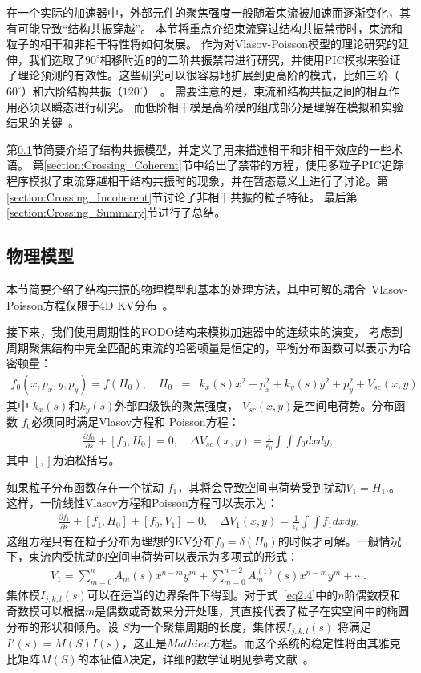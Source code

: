 在一个实际的加速器中，外部元件的聚焦强度一般随着束流被加速而逐渐变化，其有可能导致“结构共振穿越”。
本节将重点介绍束流穿过结构共振禁带时，束流和粒子的相干和非相干特性将如何发展。
作为对Vlasov-Poisson模型的理论研究的延伸，我们选取了$90^{\circ}$相移附近的的二阶共振禁带进行研究，并使用PIC模拟来验证了理论预测的有效性。这些研究可以很容易地扩展到更高阶的模式，比如三阶（$60^{\circ}$）和六阶结构共振（$120^{\circ}$）~\cite{36,40}。
需要注意的是，束流和结构共振之间的相互作用必须以瞬态进行研究。
而低阶相干模是高阶模的组成部分是理解在模拟和实验结果的关键~\cite{groening2009experimental,33}。

第\ref{section:Crossing_model}节简要介绍了结构共振模型，并定义了用来描述相干和非相干效应的一些术语。
第\ref{section:Crossing_Coherent}节中给出了禁带的方程，使用多粒子PIC追踪程序模拟了束流穿越相干结构共振时的现象，并在暂态意义上进行了讨论。第\ref{section:Crossing_Incoherent}节讨论了非相干共振的粒子特征。
最后第\ref{section:Crossing_Summary}节进行了总结。

\subsection{物理模型}
\label{section:Crossing_model}
本节简要介绍了结构共振的物理模型和基本的处理方法，其中可解的耦合~Vlasov-Poisson方程仅限于4D KV分布~\cite{20}。

接下来，我们使用周期性的FODO结构来模拟加速器中的连续束的演变， 考虑到周期聚焦结构中完全匹配的束流的哈密顿量是恒定的，平衡分布函数可以表示为哈密顿量：
\begin{eqnarray}\label{eq2.1}
  f_0(x,p_x,y,p_y) =f(H_0),  \quad  H_0&=&k_x(s)x^2+p_x^2+k_y(s)y^2+p_y^2+V_{sc}(x,y)
\end{eqnarray}
其中 $k_x(s)$和$k_y(s)$外部四级铁的聚焦强度， $V_{sc}(x,y)$是空间电荷势。分布函数 $f_0$必须同时满足Vlasov方程和 Poisson方程：
\begin{eqnarray}\label{eq2.2}
\frac{\partial f_0}{\partial s} + [f_0,H_0]=0,   \quad \Delta V_{sc}(x,y)  = \frac{1}{\epsilon_0}  \int \int f_0 dxdy,
\end{eqnarray}
其中 $[,]$为泊松括号。

如果粒子分布函数存在一个扰动 $f_1$，其将会导致空间电荷势受到扰动$V_1=H_1$.。这样，一阶线性Vlasov方程和Poisson方程可以表示为：
\begin{eqnarray}\label{eq2.3}
\frac{\partial f_1}{\partial s} + [f_1,H_0] +  [f_0,V_1]=0,   \quad \Delta V_1(x,y)  = \frac{1}{\epsilon_0}  \int \int f_1 dxdy.
\end{eqnarray}
这组方程只有在粒子分布为理想的KV分布$f_0=\delta(H_0)$的时候才可解。一般情况下，束流内受扰动的空间电荷势可以表示为多项式的形式：
\begin{eqnarray}\label{eq2.4}
V_1=\sum_{m=0}^{n}A_m(s)x^{n-m}y^m +\sum_{m=0}^{n-2}A_m^{(1)}(s)x^{n-m}y^m+\cdots.
\end{eqnarray}
集体模$I_{j;k,l}(s)$可以在适当的边界条件下得到。对于式~\ref{eq2.4}中的$n$阶偶数模和奇数模可以根据$m$是偶数或奇数来分开处理，其直接代表了粒子在实空间中的椭圆分布的形状和倾角。设 $S$为一个聚焦周期的长度，集体模$I_{j;k,l}(s)$ 将满足$I'(s) = M(S)I(s)$，这正是$Mathieu$方程。而这个系统的稳定性将由其雅克比矩阵$M(S)$的本征值$\lambda$决定，详细的数学证明见参考文献~\cite{11,12,18,19}。

